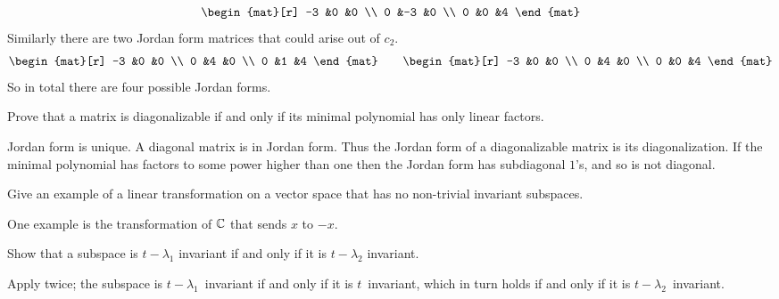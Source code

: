 \begin{exercises}
\begin{answer}
\begin{equation*}
\begin{mat}[r]
          -3  &0  &0  \\
           0  &-3 &0  \\
           0  &0  &4
        \end{mat}
      \end{equation*}
      Similarly there are two Jordan form matrices that could arise
      out of $c_2$.
      \begin{equation*}
        \begin{mat}[r]
          -3  &0  &0  \\
           0  &4  &0  \\
           0  &1  &4
        \end{mat}
        \qquad
        \begin{mat}[r]
          -3  &0  &0  \\
           0  &4  &0  \\
           0  &0  &4
        \end{mat}
     \end{equation*}  
     So in total there are four possible Jordan forms.
    \end{answer}
  \recommended \item
    Prove that a matrix is diagonalizable if and only if its minimal
    polynomial has only linear factors.
    \begin{answer}
       Jordan form is unique.
       A diagonal matrix is in Jordan form.
       Thus the Jordan form of a diagonalizable matrix is its diagonalization.
       If the minimal polynomial has factors to some power higher than one
       then the Jordan form has subdiagonal \( 1 \)'s, and so is not
       diagonal.  
     \end{answer}
  \item 
    Give an example of a linear transformation on a vector
    space that has no non-trivial invariant subspaces.
    \begin{answer}
      One example is the transformation of \( \mathbb{C} \) that
       sends \( x \) to \( -x \).  
     \end{answer}
  \item 
    Show that a subspace is \( t-\lambda_1 \) invariant if and only if
    it is \( t-\lambda_2 \) invariant.
    \begin{answer}
      Apply  twice;
      the subspace is $t-\lambda_1$~invariant if and only if it is 
      $t$~invariant, which in turn holds if and only if it is 
      $t-\lambda_2$~invariant.  
    \end{answer}

\end{exercises}
